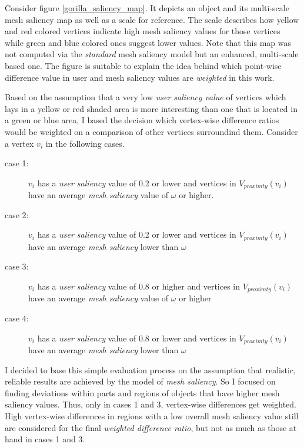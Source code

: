 Consider figure \ref{gorilla_saliency_map}. It depicts an object and its multi-scale mesh saliency map as well as a scale for reference. The scale describes how yellow and red colored vertices indicate high mesh saliency values for those vertices while green and blue colored ones suggest lower values. Note that this map was not computed via the \textit{standard} mesh saliency model but an enhanced, multi-scale based one. The figure is suitable to explain the idea behind which point-wise difference value in user and mesh saliency values are \textit{weighted} in this work.

Based on the assumption that a very low \textit{user saliency value} of vertices which lays in a yellow or red shaded area is more interesting than one that is located in a green or blue area, I based the decision which vertex-wise difference ratios would be weighted on a comparison of other vertices surroundind them. Consider a vertex $v_i$ in the following cases.

\begin{description}
	\item [case 1:] $v_i$ has a \textit{user saliency} value of 0.2 or lower and vertices in $V_{proximty}(v_i)$ have an average \textit{mesh saliency} value of $\omega$ or higher.
	\item [case 2:] $v_i$ has a \textit{user saliency} value of 0.2 or lower and vertices in $V_{proximty}(v_i)$ have an average \textit{mesh saliency} lower than $\omega$
	\item [case 3:] $v_i$ has a \textit{user saliency} value of 0.8 or higher and vertices in $V_{proximty}(v_i)$ have an average \textit{mesh saliency} value of $\omega$ or higher
	\item [case 4:] $v_i$ has a \textit{user saliency} value of 0.8 or lower and vertices in $V_{proximty}(v_i)$ have an average \textit{mesh saliency} lower than $\omega$
\end{description}

I decided to base this simple evaluation process on the assumption that realistic, reliable results are achieved by the model of \textit{mesh saliency}. So I focused on finding deviations within parts and regions of objects that have higher mesh saliency values. Thus, only in cases 1 and 3, vertex-wise differences get weighted. High vertex-wise differences in regions with a low overall mesh saliency value still are considered for the final \textit{weighted difference ratio}, but not as much as those at hand in cases 1 and 3.

